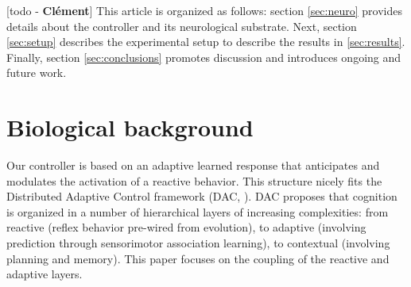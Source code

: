 \documentclass[letterpaper, 10 pt, conference]{ieeeconf}  %
\newcommand\cmf[1]{{\footnotesize \color{red}[#1 - \textbf{Cl\'ement}]}} %
\begin{document}




\cmf{todo}
This article is organized as follows: section \ref{sec:neuro} provides details about the controller and its neurological substrate. Next, section \ref{sec:setup} describes the experimental setup to describe the results in \ref{sec:results}. Finally, section \ref{sec:conclusions} promotes discussion and introduces ongoing and future work. 


\section{Biological background}
\label{sec:bio}

Our controller is based on an adaptive learned response that anticipates and modulates the activation of a reactive behavior. 
This structure nicely fits the Distributed Adaptive Control framework (DAC, \cite{verschure2003environmentally,verschure2014why}). DAC proposes that cognition is organized in a number of hierarchical layers of increasing complexities: from reactive (reflex behavior pre-wired from evolution), to adaptive (involving prediction through sensorimotor association learning), to contextual (involving planning and memory). This paper focuses on the coupling of the reactive and adaptive layers. 
\end{document}
